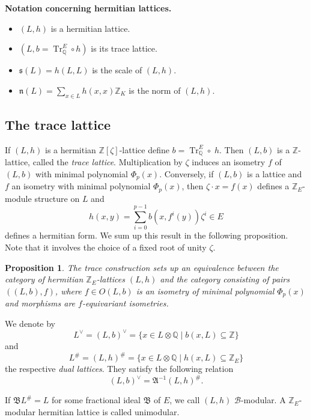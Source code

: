 \documentclass{amsart}
\theoremstyle{definition}
\theoremstyle{plain}
\newtheorem{proposition}[definition]{Proposition}
\DeclareMathOperator{\Tr}{Tr}
\newcommand{\QQ}{\mathbb{Q}}
\newcommand{\ZZ}{\mathbb{Z}}
\begin{document}
\noindent\textbf{Notation concerning hermitian lattices.}
\begin{itemize}
 \item $(L,h)$ is a hermitian lattice.
 \item $(L,b=\Tr^E_\QQ \circ h)$ is its trace lattice.
 \item $\mathfrak{s}(L)=h(L,L)$ is the scale of $(L,h)$.
 \item $\mathfrak{n}(L)=\sum_{x \in L} h(x,x)\ZZ_K$ is the norm of $(L,h)$.
\end{itemize}

\subsection{The trace lattice}
If $(L,h)$ is a hermitian $\ZZ[\zeta]$-lattice define $b = \Tr^E_\QQ \circ\; h$. Then $(L,b)$ is a $\ZZ$-lattice, called the \emph{trace lattice}. Multiplication by $\zeta$ induces an isometry $f$ of $(L,b)$ with minimal polynomial $\Phi_p(x)$.
Conversely, if $(L,b)$ is a lattice and $f$ an isometry with minimal polynomial $\Phi_p(x)$, then $\zeta\cdot x = f(x)$ defines a $\ZZ_E$-module structure on $L$ and
\begin{equation}\label{eqn:hermitian_form}
h(x,y) = \sum_{i=0}^{p-1} b(x,f^i(y)) \zeta^i \in E
\end{equation}
\noindent defines a hermitian form.
We sum up this result in the following proposition. Note that it involves the choice of a fixed root of unity $\zeta$.
\begin{proposition}
The trace construction sets up an equivalence between the category of hermitian $\ZZ_E$-lattices $(L,h)$ and
the category consisting of pairs $((L,b),f)$, where $f \in O(L,b)$ is an isometry of minimal polynomial $\Phi_p(x)$ and morphisms are $f$-equivariant isometries.
\end{proposition}
We denote by 
\[L^\vee=(L,b)^\vee = \{ x \in L \otimes \QQ \mid b(x,L) \subseteq \ZZ  \}   \]
and
\[L^\#=(L,h)^\#= \{ x \in L \otimes \QQ \mid h(x,L) \subseteq \ZZ_E  \} \]
the respective \emph{dual lattices}.
They satisfy the following relation
\begin{equation}\label{eqn:discr}
(L,b)^\vee = \mathfrak{A}^{-1} (L,h)^\#.
\end{equation}

If $\mathfrak{B}L^\#=L$ for some fractional ideal $\mathfrak{B}$ of $E$, we call $(L,h)$ $\mathcal{B}$-modular. A $\ZZ_E$-modular hermitian lattice is called unimodular.
\end{document}
